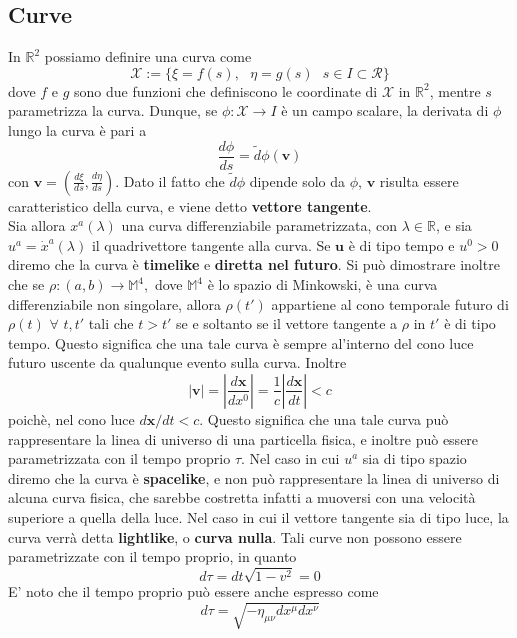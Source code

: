 \documentclass[a4paper,11pt]{book}
\theoremstyle{plain}
\theoremstyle{definition}
\begin{document}
\subsection{Curve}
In $\mathbb{R}^2$ possiamo definire una curva come
\[
\mathcal{X} := \{ \xi = f(s), \text{ }\eta = g(s) \text{ } s\in I \subset \mathcal{R} \}
\]
dove $f$ e $g$ sono due funzioni che definiscono le coordinate di $\mathcal{X}$ in $\mathbb{R}^2$, mentre $s$ parametrizza la curva. Dunque, se $\phi: \mathcal{X}\to I$ è un campo scalare, la derivata di $\phi$ lungo la curva è pari a 
\[
\frac{d\phi}{ds}=\tilde{d}\phi(\textbf{v})
\]
con $\textbf{v}=\left( \frac{d\xi}{ds},\frac{d\eta}{ds} \right)$. Dato il fatto che $\tilde{d}\phi$ dipende solo da $\phi$, $\textbf{v}$ risulta essere caratteristico della curva, e viene detto \textbf{vettore tangente}.
\\
Sia allora $x^a(\lambda)$ una curva differenziabile parametrizzata, con $\lambda\in\mathbb{R}$, e sia $u^a=\dot x^a(\lambda)$ il quadrivettore tangente alla curva. Se $\textbf{u}$ è di tipo tempo e $u^0>0$ diremo che la curva è \textbf{timelike} e \textbf{diretta nel futuro}. Si può dimostrare inoltre che se $\rho: (a,b) \to \mathbb{M}^4,$ dove $\mathbb{M}^4$ è lo spazio di Minkowski, è una curva differenziabile non singolare, allora $\rho(t')$ appartiene al cono temporale futuro di $\rho(t)$ $\forall$ $t,t'$ tali che $t>t'$ se e soltanto se il vettore tangente a $\rho$ in $t'$ è di tipo tempo. Questo significa che una tale curva è sempre al'interno del cono luce futuro uscente da qualunque evento sulla curva. Inoltre
\[
|\textbf{v}|=\left| \frac{d\textbf{x}}{dx^0} \right|=\frac{1}{c}\left|\frac{d\textbf{x}}{dt}  \right| < c
\]
poichè, nel cono luce $d\textbf{x}/dt<c$. Questo significa che una tale curva può rappresentare la linea di universo di una particella fisica, e inoltre può essere parametrizzata con il tempo proprio $\tau$. Nel caso in cui $u^a$ sia di tipo spazio diremo che la curva è \textbf{spacelike}, e non può rappresentare la linea di universo di alcuna curva fisica, che sarebbe costretta infatti a muoversi con una velocità superiore a quella della luce. Nel caso in cui il vettore tangente sia di tipo luce, la curva verrà detta \textbf{lightlike}, o \textbf{curva nulla}. Tali curve non possono essere parametrizzate con il tempo proprio, in quanto
\begin{equation}\label{eq:proper1}
d\tau=dt \sqrt{1-v^2}=0
\end{equation}
E' noto che il tempo proprio può essere anche espresso come
\begin{equation}\label{eq:proper}
d\tau = \sqrt{-\eta_{\mu\nu}dx^{\mu}dx^{\nu}}
\end{equation}
\end{document}
